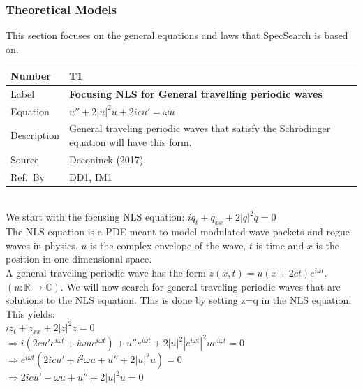 \documentclass[12pt]{article}
\newcommand{\colAwidth}{0.13\textwidth}
\newcommand{\colBwidth}{0.82\textwidth}
\begin{document}
\subsubsection{Theoretical Models}\label{sec_theoretical}

This section focuses on the general equations and laws that SpecSearch is based
on. 
~\newline

\noindent
\begin{minipage}{\textwidth}
	\renewcommand*{\arraystretch}{1.5}
	\begin{tabular}{| p{\colAwidth} | p{\colBwidth}|}
		\hline
		\rowcolor[gray]{0.9}
		Number& T1\\
		\hline
		Label&\bf Focusing NLS for General travelling periodic waves\\
		\hline
		Equation&  $ u'' + 2|u|^{2}u+2icu'=\omega u$\\
		\hline
		Description & 
		General traveling periodic waves that satisfy the Schr\"{o}dinger 
		equation 
		will have this form. \\
		\hline
		Source &
		Deconinck (2017)\\
		\hline
		Ref.\ By & DD1, IM1\\
		\hline
	\end{tabular}
\end{minipage}\\ 

We start with the focusing NLS equation: $iq_{t} + q_{xx} + 
2|q|^{2}q=0$ \\ 

The NLS equation is a PDE meant to model modulated wave packets and rogue waves 
in physics. $u$ is the complex envelope of the wave, $t$ is time and $x$ is the 
position in one dimensional space. \\ 

A general traveling periodic wave has the form $z(x,t)=u(x+2ct)e^{i \omega 
t}$.$(u: \mathbb{R} \rightarrow \mathbb{C})$. 
We will now search for general traveling periodic waves that are solutions to 
the NLS equation. This is done by setting z=q in the NLS equation. This 
yields: \\ 

$ iz_{t} + z_{xx} + 2|z|^{2}z = 0$ \\ 
$ \Rightarrow i(2cu'e^{i \omega t} + i \omega ue^{i \omega t}) + u''e^{i \omega 
t} + 2|u|^{2}|e^{i \omega t}|^{2} u e^{i \omega t} = 0 $ \\
 $\Rightarrow e^{i \omega t} (2icu' + i^{2} \omega u + u'' + 2|u|^{2}u) = 0 $ 
 \\ 
$ \Rightarrow 2icu' - \omega u + u'' + 2|u|^{2}u =0$ \\ 
\end{document}
